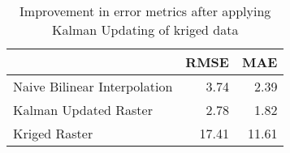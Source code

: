 \begin{table}
\centering
\caption{Improvement in error metrics after applying Kalman Updating of kriged data}
\label{tab:oahu3_gebco_raster_error}
\begin{tabular}{lrr}
\toprule
 & RMSE & MAE \\
\midrule
Naive Bilinear Interpolation & 3.74 & 2.39 \\
Kalman Updated Raster & 2.78 & 1.82 \\
Kriged Raster & 17.41 & 11.61 \\
\bottomrule
\end{tabular}
\end{table}
